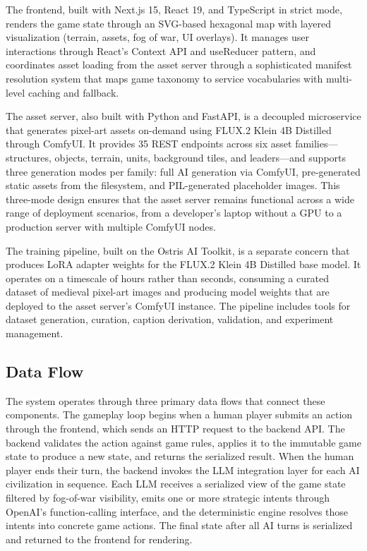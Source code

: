 \documentclass[conference]{IEEEtran}
\begin{document}
The frontend, built with Next.js 15, React 19, and TypeScript in strict mode, renders the game state through an SVG-based hexagonal map with layered visualization (terrain, assets, fog of war, UI overlays). It manages user interactions through React's Context API and useReducer pattern, and coordinates asset loading from the asset server through a sophisticated manifest resolution system that maps game taxonomy to service vocabularies with multi-level caching and fallback.

The asset server, also built with Python and FastAPI, is a decoupled microservice that generates pixel-art assets on-demand using FLUX.2 Klein 4B Distilled through ComfyUI. It provides 35 REST endpoints across six asset families---structures, objects, terrain, units, background tiles, and leaders---and supports three generation modes per family: full AI generation via ComfyUI, pre-generated static assets from the filesystem, and PIL-generated placeholder images. This three-mode design ensures that the asset server remains functional across a wide range of deployment scenarios, from a developer's laptop without a GPU to a production server with multiple ComfyUI nodes.

The training pipeline, built on the Ostris AI Toolkit, is a separate concern that produces LoRA adapter weights for the FLUX.2 Klein 4B Distilled base model. It operates on a timescale of hours rather than seconds, consuming a curated dataset of medieval pixel-art images and producing model weights that are deployed to the asset server's ComfyUI instance. The pipeline includes tools for dataset generation, curation, caption derivation, validation, and experiment management.

\subsection{Data Flow}

The system operates through three primary data flows that connect these components. The gameplay loop begins when a human player submits an action through the frontend, which sends an HTTP request to the backend API. The backend validates the action against game rules, applies it to the immutable game state to produce a new state, and returns the serialized result. When the human player ends their turn, the backend invokes the LLM integration layer for each AI civilization in sequence. Each LLM receives a serialized view of the game state filtered by fog-of-war visibility, emits one or more strategic intents through OpenAI's function-calling interface, and the deterministic engine resolves those intents into concrete game actions. The final state after all AI turns is serialized and returned to the frontend for rendering.
\end{document}
